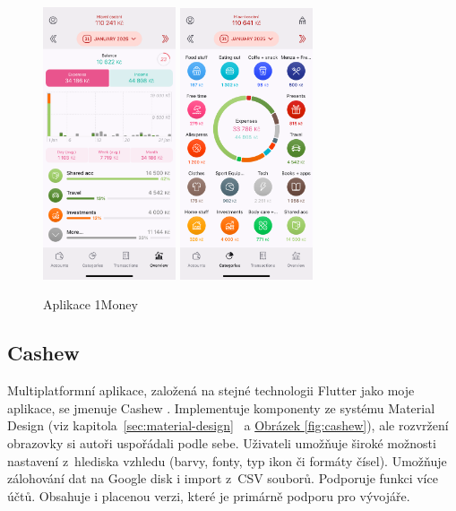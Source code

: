 \documentclass[
  biblatex,
  figures=true,
  tables=false,
  glossaries,
  index
]{kidiplom}
\begin{document}
\begin{figure}
    \centering
    \includegraphics[width=0.35\textwidth]{images/onemoney1.PNG}
    \hspace{10px}
    \includegraphics[width=0.35\textwidth]{images/onemoney2.PNG}
    \caption{Aplikace 1Money}
    \label{fig:1money}
\end{figure}

\subsection{Cashew}
Multiplatformní aplikace, založená na stejné technologii Flutter jako moje aplikace, se jmenuje Cashew \cite{cashew}. Implementuje komponenty ze systému Material Design (viz kapitola~\ref{sec:material-design}~ a \hyperref[fig:cashew]{Obrázek \ref{fig:cashew}}), ale rozvržení obrazovky si autoři uspořádali podle sebe. Uživateli umožňuje široké možnosti nastavení z~hlediska vzhledu (barvy, fonty, typ ikon či formáty čísel). Umožňuje zálohování dat na Google disk i import z~CSV souborů. Podporuje funkci více účtů. Obsahuje i placenou verzi, které je primárně podporu pro vývojáře.
\end{document}
